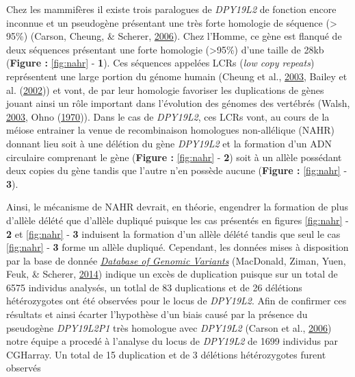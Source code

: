 \documentclass[12pt,twoside]{reedthesis}
\theoremstyle{definition}
\theoremstyle{definition}
\theoremstyle{remark}
\begin{document}
  Chez les mammifères il existe trois paralogues de \emph{DPY19L2} de
  fonction encore inconnue et un pseudogène présentant une très forte
  homologie de séquence (\textgreater{} 95\%) (Carson, Cheung, \& Scherer,
  \protect\hyperlink{ref-Carson2006}{2006}). Chez l'Homme, ce gène est
  flanqué de deux séquences présentant une forte homologie
  (\textgreater{}95\%) d'une taille de 28kb (\textbf{Figure :
  }\ref{fig:nahr} - \textbf{1}). Ces séquences appelées LCRs (\emph{low
  copy repeats}) représentent une large portion du génome humain (Cheung
  et al., \protect\hyperlink{ref-Cheung2003}{2003}, Bailey et al.
  (\protect\hyperlink{ref-Bailey2002}{2002})) et vont, de par leur
  homologie favoriser les duplications de gènes jouant ainsi un rôle
  important dans l'évolution des génomes des vertébrés (Walsh,
  \protect\hyperlink{ref-Walsh2003}{2003}, Ohno
  (\protect\hyperlink{ref-Ohno1970}{1970})). Dans le cas de
  \emph{DPY19L2}, ces LCRs vont, au cours de la méiose entrainer la venue
  de recombinaison homologues non-allélique (NAHR) donnant lieu soit à une
  délétion du gène \emph{DPY19L2} et la formation d'un ADN circulaire
  comprenant le gène (\textbf{Figure : }\ref{fig:nahr} - \textbf{2}) soit
  à un allèle possédant deux copies du gène tandis que l'autre n'en
  possède aucune (\textbf{Figure : }\ref{fig:nahr} - \textbf{3}).
  
  Ainsi, le mécanisme de NAHR devrait, en théorie, engendrer la formation
  de plus d'allèle délété que d'allèle dupliqué puisque les cas présentés
  en figures \ref{fig:nahr} - \textbf{2} et \ref{fig:nahr} - \textbf{3}
  induisent la formation d'un allèle délété tandis que seul le cas
  \ref{fig:nahr} - \textbf{3} forme un allèle dupliqué. Cependant, les
  données mises à disposition par la base de donnée
  \href{http://dgv.tcag.ca/dgv/app/home}{\emph{Database of Genomic
  Variants}} (MacDonald, Ziman, Yuen, Feuk, \& Scherer,
  \protect\hyperlink{ref-MacDonald2014}{2014}) indique un excès de
  duplication puisque sur un total de 6575 individus analysés, un totlal
  de 83 duplications et de 26 délétions hétérozygotes ont été observées
  pour le locus de \emph{DPY19L2}. Afin de confirmer ces résultats et
  ainsi écarter l'hypothèse d'un biais causé par la présence du pseudogène
  \emph{DPY19L2P1} très homologue avec \emph{DPY19L2} (Carson et al.,
  \protect\hyperlink{ref-Carson2006}{2006}) notre équipe a procedé à
  l'analyse du locus de \emph{DPY19L2} de 1699 individus par CGHarray. Un
  total de 15 duplication et de 3 délétions hétérozygotes furent observés
  
\end{document}
